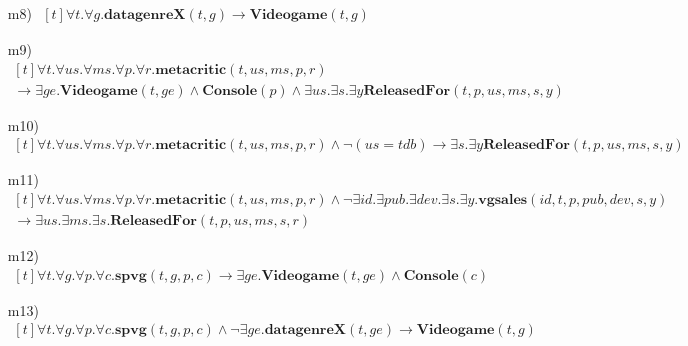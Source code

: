 \begin{itemize}
	\item[m8)]
	$ \begin{aligned}[t]
	\forall t. \forall g.\textbf{datagenreX}(t,g) \rightarrow \textbf{Videogame}(t,g)
	\end{aligned} $
	\item[m9)]
	$ \begin{aligned}[t]
	\forall t. \forall us. \forall ms. \forall p. \forall r.\textbf{metacritic}(t,us,ms,p,r) \hspace{200pt} \\
	\rightarrow \exists ge. \textbf{Videogame}(t,ge) \wedge \textbf{Console}(p) \wedge \exists us. \exists s. \exists y \textbf{ReleasedFor}(t,p,us,ms, s,y)
	\end{aligned} $
	\item[m10)]
	$ \begin{aligned}[t]
	\forall t. \forall us. \forall ms. \forall p. \forall r.\textbf{metacritic}(t,us,ms,p,r) \wedge \neg (us = tdb) \rightarrow \exists s. \exists y \textbf{ReleasedFor}(t,p,us,ms, s,y)
	\end{aligned} $
	\item[m11)]
	$ \begin{aligned}[t]
	\forall t. \forall us. \forall ms. \forall p. \forall r.\textbf{metacritic}(t,us,ms,p,r) \wedge
	\neg \exists id. \exists pub. \exists dev. \exists s. \exists y.\textbf{vgsales}(id,t,p,pub,dev,s,y) \\
	\rightarrow \exists us. \exists ms. \exists s. \textbf{ReleasedFor}(t,p,us,ms,s,r) \hspace{240pt}
	\end{aligned} $
\end{itemize}

\begin{itemize}
	\item[m12)]
	$ \begin{aligned}[t]
		\forall t. \forall g. \forall p. \forall c. \textbf{spvg}(t,g,p,c) \rightarrow \exists ge. \textbf{Videogame}(t,ge) \wedge \textbf{Console}(c)
	\end{aligned} $
	\item[m13)]
	$ \begin{aligned}[t]
	\forall t. \forall g. \forall p. \forall c. \textbf{spvg}(t,g,p,c) \wedge \neg \exists ge.\textbf{datagenreX}(t,ge)
	\rightarrow \textbf{Videogame}(t,g)
	\end{aligned} $
\end{itemize}


